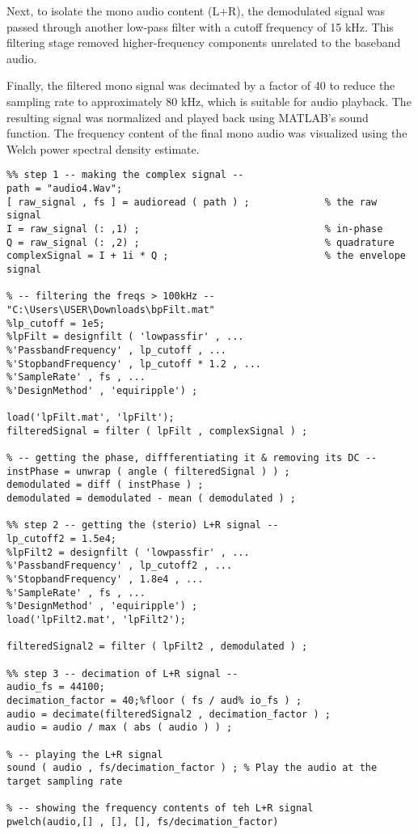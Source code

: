 \documentclass{article}
\begin{document}
Next, to isolate the mono audio content (L+R), the demodulated signal was passed through another low-pass filter with a cutoff frequency of 15 kHz. This filtering stage removed higher-frequency components unrelated to the baseband audio.

Finally, the filtered mono signal was decimated by a factor of 40 to reduce the sampling rate to approximately 80 kHz, which is suitable for audio playback. The resulting signal was normalized and played back using MATLAB's sound function. The frequency content of the final mono audio was visualized using the Welch power spectral density estimate.

\begin{lstlisting}
%% step 1 -- making the complex signal --
path = "audio4.Wav";
[ raw_signal , fs ] = audioread ( path ) ;             % the raw signal
I = raw_signal (: ,1) ;                                % in-phase 
Q = raw_signal (: ,2) ;                                % quadrature
complexSignal = I + 1i * Q ;                           % the envelope signal

% -- filtering the freqs > 100kHz --"C:\Users\USER\Downloads\bpFilt.mat"
%lp_cutoff = 1e5;
%lpFilt = designfilt ( 'lowpassfir' , ...
%'PassbandFrequency' , lp_cutoff , ...
%'StopbandFrequency' , lp_cutoff * 1.2 , ...
%'SampleRate' , fs , ...
%'DesignMethod' , 'equiripple') ;

load('lpFilt.mat', 'lpFilt');
filteredSignal = filter ( lpFilt , complexSignal ) ;

% -- getting the phase, diffferentiating it & removing its DC --
instPhase = unwrap ( angle ( filteredSignal ) ) ;
demodulated = diff ( instPhase ) ;
demodulated = demodulated - mean ( demodulated ) ;

%% step 2 -- getting the (sterio) L+R signal --
lp_cutoff2 = 1.5e4;
%lpFilt2 = designfilt ( 'lowpassfir' , ...
%'PassbandFrequency' , lp_cutoff2 , ...
%'StopbandFrequency' , 1.8e4 , ...
%'SampleRate' , fs , ...
%'DesignMethod' , 'equiripple') ;
load('lpFilt2.mat', 'lpFilt2');

filteredSignal2 = filter ( lpFilt2 , demodulated ) ;

%% step 3 -- decimation of L+R signal --
audio_fs = 44100;
decimation_factor = 40;%floor ( fs / aud% io_fs ) ;
audio = decimate(filteredSignal2 , decimation_factor ) ;
audio = audio / max ( abs ( audio ) ) ;

% -- playing the L+R signal
sound ( audio , fs/decimation_factor ) ; % Play the audio at the target sampling rate

% -- showing the frequency contents of teh L+R signal
pwelch(audio,[] , [], [], fs/decimation_factor)

\end{lstlisting}
\end{document}
